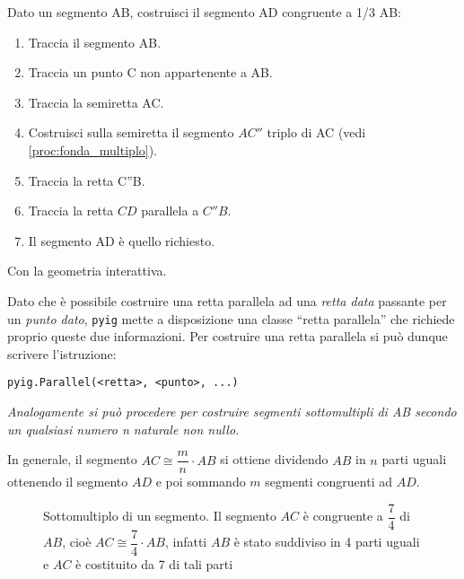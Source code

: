 \begin{procedura}\label{proc:fonda_sottomultiplo}
  Dato un segmento AB, costruisci il segmento AD congruente a 1/3 AB:
  \begin{enumerate} [nosep]
    \item 
    Traccia il segmento AB.    
    \item 
    Traccia un punto C non appartenente a AB.   
    \item 
    Traccia la semiretta AC.    
    \item 
    Costruisci sulla semiretta il segmento \(AC''\) triplo di AC
    (vedi \ref{proc:fonda_multiplo}).
    \item 
    Traccia la retta C''B. 
    \item 
    Traccia la retta \(CD\) parallela a \(C''B\).      
    \item 
    Il segmento AD è quello richiesto.    
  \end{enumerate}
\end{procedura}

\ifcoding
Con la geometria interattiva.

\begin{osservazione}
Dato che è possibile costruire una retta parallela ad una \emph{retta data} 
passante per un \emph{punto dato}, \lstinline{pyig} mette a disposizione una 
classe ``retta parallela'' che richiede proprio queste due informazioni.
Per costruire una retta parallela si può dunque scrivere l'istruzione:

\lstinline{pyig.Parallel(<retta>, <punto>, ...)}
\end{osservazione}


\fi

\textit{Analogamente si può procedere per costruire segmenti sottomultipli di 
AB secondo un qualsiasi numero n naturale non nullo.}

In generale, il segmento $AC\cong\dfrac{m}{n}\cdot AB$ si ottiene 
dividendo $AB$ in $n$ parti uguali ottenendo il segmento $AD$ e poi 
sommando $m$ segmenti congruenti ad $AD$.

\begin{inaccessibleblock}
 \begin{figure}[htb]
\centering
\caption{Sottomultiplo di un segmento. Il segmento $AC$ è congruente 
a $\dfrac{7}{4}$ di $AB$, cioè $AC\cong\dfrac{7}{4}\cdot AB$, infatti 
$AB$ è stato suddiviso in 4 parti uguali e $AC$ è costituito da 7 di 
tali parti}
\end{figure}
\end{inaccessibleblock}

